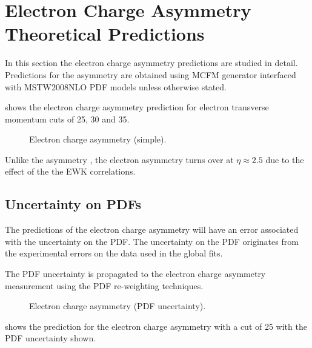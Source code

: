 \section{Electron Charge Asymmetry Theoretical Predictions}

In this section the electron charge asymmetry predictions are studied in detail.
Predictions for the asymmetry are obtained using MCFM \cite{test} generator
interfaced with MSTW2008NLO PDF models unless otherwise stated.

 shows the electron charge asymmetry prediction for
electron transverse momentum cuts of 25, 30 and \unit{35}{\GeV}.


\begin{figure}[htbp]
  \centering
  \caption{Electron charge asymmetry (simple).}
  \label{wbos:asym_simple}
\end{figure}

Unlike the \PW asymmetry , the electron asymmetry turns over at $\eta\approx
2.5$ due to the effect of the the \ac{EWK} correlations.


\subsection{Uncertainty on \acp{PDF}}

The predictions of the electron charge asymmetry will have an error associated
with the uncertainty on the \ac{PDF}.
The uncertainty on the \ac{PDF} originates from the experimental errors on the
data used in the global fits.

The \ac{PDF} uncertainty is propagated to the electron charge asymmetry
measurement using the \ac{PDF} re-weighting techniques\cite{}.

\begin{figure}[htbp]
  \centering
  \caption{Electron charge asymmetry (PDF uncertainty).}
  \label{wbos:asym_pdfuncert}
\end{figure}

 shows the prediction for the electron charge
asymmetry with a \PT cut of \unit{25}{\GeV} with the \ac{PDF} uncertainty shown.

